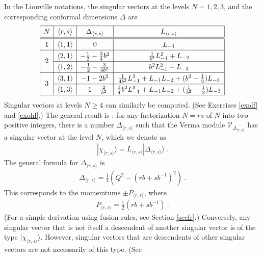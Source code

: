 \documentclass[12pt, a4paper, notitlepage, twoside]{report}
\numberwithin{equation}{section}
\theoremstyle{break}
\begin{document}
In the Liouville notations, the singular vectors at the levels $N=1,2,3$, and the corresponding conformal dimensions $\Delta$ are 
\begin{align}
\renewcommand{\arraystretch}{1.3}
\begin{array}{|c|c|c|c|}
\hline 
N & \langle r,s\rangle & \Delta_{\langle r,s\rangle} & L_{\langle r,s\rangle} 
\\
\hline\hline
1 & \langle 1,1\rangle & 0  & L_{-1}
\\
\hline
\multirow{2}{*}{2} & 
\langle 2,1\rangle & -\frac12 -\frac{3}{4} b^2  & \frac{1}{b^2}L_{-1}^2 + L_{-2}
\\
\cline{2-4}
& \langle 1,2\rangle & -\frac12 - \frac{3}{4b^2}  & b^2L_{-1}^2 + L_{-2} 
\\
\hline
\multirow{2}{*}{3} &
\langle 3,1 \rangle &  -1 -2 b^2  & \frac{1}{4b^2}L_{-1}^3 + L_{-1}L_{-2}+(b^2-\frac12)L_{-3}
\\
\cline{2-4}
& \langle 1,3 \rangle &  -1 - \frac{2}{b^2}  & \frac14 b^2L_{-1}^3 + L_{-1}L_{-2} + (\frac{1}{b^2}-\frac12)L_{-3}
\\
\hline
\end{array}
\label{lot}
\end{align}
Singular vectors at levels $N\geq 4$ can similarly be computed. (See Exercises \ref{exolf} and \ref{exohl}.) The general result is \cite{fms97}: for any factorization $N=rs$ of $N$ into two positive integers, there is a number $\Delta_{\langle r,s \rangle}$ such that the Verma module $\mathcal{V}_{\Delta_{\langle r,s \rangle}}$ has a singular vector at the level $N$, which we denote as
\begin{align}
 |\chi_{\langle r,s \rangle}\rangle = L_{\langle r,s \rangle} |\Delta_{\langle r,s \rangle}\rangle\ .
\label{lrs}
\end{align}
The general formula for $\Delta_{\langle r,s \rangle}$ is
\begin{align}
 \Delta_{\langle r,s \rangle} = \frac14\left(Q^2-(rb+sb^{-1})^2\right)\ .
\label{drs}
\end{align}
This corresponds to the momemtums $\pm P_{\langle r,s \rangle}$, where
\begin{align}
 \boxed{P_{\langle r,s \rangle} = \frac12\left(rb + sb^{-1}\right) }\ . 
\label{ars}
\end{align}
(For a simple derivation using fusion rules, see Section \ref{secfr}.)
Conversely, any singular vector that is not itself a descendent of another singular vector is of the type $|\chi_{\langle r,s \rangle}\rangle$.
However, singular vectors that are descendents of other singular vectors are not necessarily of this type. (See 
\end{document}
